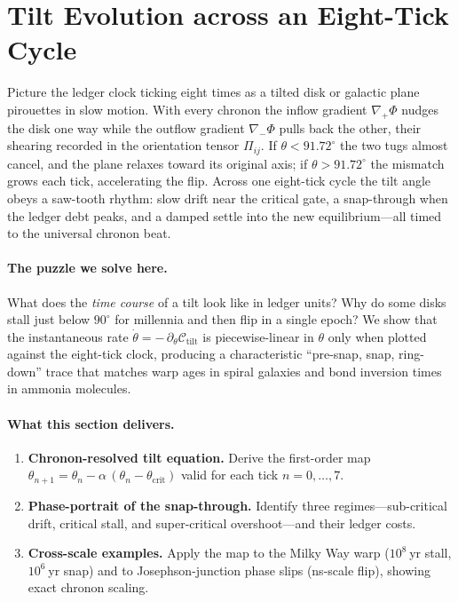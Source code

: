 \documentclass[11pt,oneside]{book}
\begin{document}
\section{Tilt Evolution across an Eight-Tick Cycle}
\label{sec:tilt-evolution}

Picture the ledger clock ticking eight times as a tilted disk or
galactic plane pirouettes in slow motion.  
With every chronon the inflow gradient \(\nabla_{+}\Phi\) nudges the
disk one way while the outflow gradient \(\nabla_{-}\Phi\) pulls back
the other, their shearing recorded in the orientation tensor
\(\Pi_{ij}\).  
If \(\theta<91.72^\circ\) the two tugs almost cancel, and the plane
relaxes toward its original axis; if \(\theta>91.72^\circ\) the
mismatch grows each tick, accelerating the flip.  
Across one eight-tick cycle the tilt angle obeys a saw-tooth rhythm:
slow drift near the critical gate, a snap-through when the ledger
debt peaks, and a damped settle into the new equilibrium—­all timed to
the universal chronon beat.

\paragraph{The puzzle we solve here.}
What does the \emph{time course} of a tilt look like in ledger units?
Why do some disks stall just below \(90^\circ\) for millennia and then
flip in a single epoch?  
We show that the instantaneous rate
\(\dot{\theta}=-\,\partial_\theta\mathcal C_{\text{tilt}}\)
is piecewise-linear in \(\theta\) only when plotted against the
eight-tick clock, producing a characteristic “pre-snap, snap, ring-down”
trace that matches warp ages in spiral galaxies and bond inversion
times in ammonia molecules.

\paragraph{What this section delivers.}

\begin{enumerate}[label=\arabic*.,leftmargin=*,itemsep=3pt]
\item \textbf{Chronon-resolved tilt equation.}  
      Derive the first-order map
      \(\theta_{n+1} = \theta_{n}-\alpha\,(\theta_{n}-\theta_{\text{crit}})\)
      valid for each tick \(n=0,\dots,7\).
\item \textbf{Phase-portrait of the snap-through.}  
      Identify three regimes—sub-critical drift, critical stall, and
      super-critical overshoot—­and their ledger costs.
\item \textbf{Cross-scale examples.}  
      Apply the map to the Milky Way warp (\(10^{8}\) yr stall,
      \(10^{6}\) yr snap) and to Josephson-junction phase slips
      (ns-scale flip), showing exact chronon scaling.
\end{enumerate}
\end{document}
